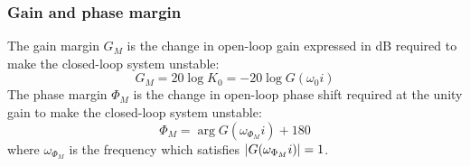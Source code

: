 \documentclass[10pt, twocolumn]{article}
\begin{document}
\subsubsection{Gain and phase margin}
The gain margin \(G_M\) is the change in open-loop gain expressed in \si{\deci\bel} required to make the closed-loop system unstable:
\[
  G_M = 20\log{K_0} = -20\log{G(\omega_0 i)}
\]
The phase margin \(\Phi_M\) is the change in open-loop phase shift required at the unity gain to make the closed-loop system unstable:
\[
  \Phi_M = \arg{G(\omega_{\Phi_M}i)} + 180
\]
where \(\omega_{\Phi_M}\) is the frequency which satisfies \(\left| G(\omega_{\Phi_M}i) \right| = 1\).
\end{document}

